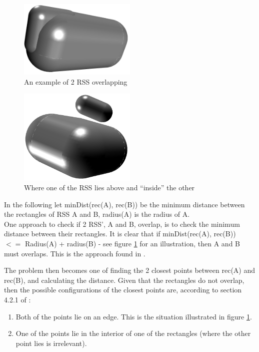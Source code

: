 \begin{figure}
\centering
\includegraphics[width=0.5\textwidth]{figures/normalInter}
\caption{\label{normal-inter}An example of 2 RSS overlapping}
\end{figure}

\begin{figure}
\centering
\includegraphics[width=0.5\textwidth]{figures/sepAxis}
\caption{\label{sep-Axis}Where one of the RSS lies above and ``inside'' the other}
\end{figure}

In the following let minDist(rec(A), rec(B)) be the minimum distance between the rectangles of RSS A and B, radius(A) is the radius of A.\\

One approach to check if 2 RSS', A and B, overlap, is to check the minimum distance between their rectangles. It is clear that if minDist(rec(A), rec(B)) $<=$ Radius(A) + radius(B) - see figure \ref{normal-inter} for an illustration, then A and B must overlaps. This is the approach found in \cite{Larsen99fastproximity}.

The problem then becomes one of finding the 2 closest points between rec(A) and rec(B), and calculating the distance.
Given that the rectangles do not overlap, then the possible configurations of the closest points are, according to section 4.2.1 of \cite{Larsen99fastproximity}:
\begin{enumerate}
\item Both of the points lie on an edge. This is the situation illustrated in figure \ref{normal-inter}.
\item One of the points lie in the interior of one of the rectangles (where the other point lies is irrelevant). 
\end{enumerate}

